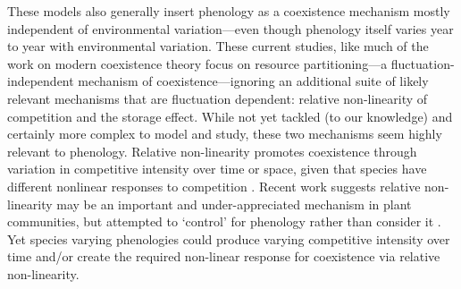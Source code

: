 \documentclass[11pt]{article}
\begin{document}
These models also generally insert phenology as a coexistence mechanism mostly independent of environmental variation---even though phenology itself varies year to year with environmental variation. These current studies, like much of the work on modern coexistence theory focus on resource partitioning---a fluctuation-independent mechanism of coexistence---ignoring an additional suite of likely relevant mechanisms that are fluctuation dependent: relative non-linearity of competition and the storage effect. While not yet tackled (to our knowledge) and certainly more complex to model and study, these two mechanisms seem highly relevant to phenology. Relative non-linearity promotes coexistence through variation in competitive intensity over time or space, given that species have different nonlinear responses to competition \citep{CHESSON:1994vn,Chesson:2000vd}. Recent work suggests relative non-linearity may be an important and under-appreciated mechanism in plant communities, but attempted to `control' for phenology rather than consider it \citep{hallett2019rainfall}. Yet species varying phenologies could produce varying competitive intensity over time and/or create the required non-linear response for coexistence via relative non-linearity. 
\end{document}
